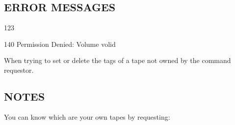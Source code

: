 \subsection{ERROR MESSAGES}
\begin{DLtt}{123}
\item[140]Permission Denied: Volume volid

	  When trying to set or delete the tags of a tape not owned by the
	  command requestor.

\end{DLtt}


\subsection{NOTES}

You can know which are your own tapes by requesting:

\begin{XMP}
\end{XMP}

